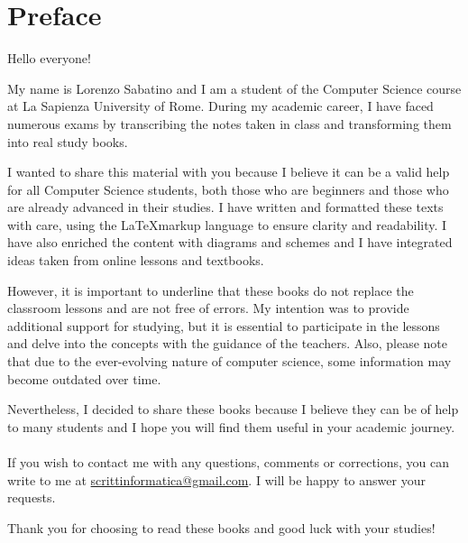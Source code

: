\chapter*{Preface}

Hello everyone!

My name is Lorenzo Sabatino and I am a student of the Computer Science course at La Sapienza University of Rome. During my academic career, I have faced numerous exams by transcribing the notes taken in class and transforming them into real study books.

I wanted to share this material with you because I believe it can be a valid help for all Computer Science students, both those who are beginners and those who are already advanced in their studies. I have written and formatted these texts with care, using the \LaTeX markup language to ensure clarity and readability. I have also enriched the content with diagrams and schemes and I have integrated ideas taken from online lessons and textbooks.

However, it is important to underline that these books do not replace the classroom lessons and are not free of errors. My intention was to provide additional support for studying, but it is essential to participate in the lessons and delve into the concepts with the guidance of the teachers. Also, please note that due to the ever-evolving nature of computer science, some information may become outdated over time.

Nevertheless, I decided to share these books because I believe they can be of help to many students and I hope you will find them useful in your academic journey.\\\\
If you wish to contact me with any questions, comments or corrections, you can write to me at \href{mailto:scrittinformatica@gmail.com}{scrittinformatica@gmail.com}. I will be happy to answer your requests.

Thank you for choosing to read these books and good luck with your studies!